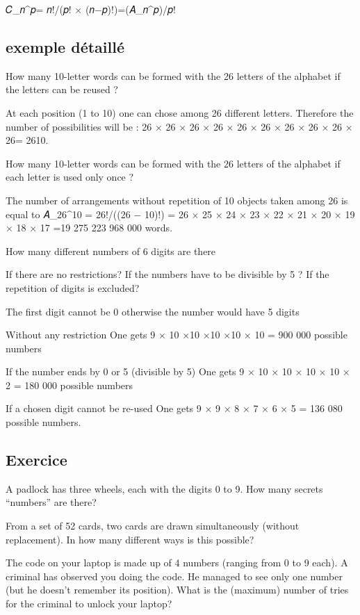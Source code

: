 \documentclass[
  letterpaper,
  DIV=11,
  numbers=noendperiod]{scrreprt}
\begin{document}
𝐶\_𝑛\^{}𝑝= 𝑛!/(𝑝! × (𝑛−𝑝)!)=(𝐴\_𝑛\^{}𝑝)/𝑝!

\subsection{exemple détaillé}\label{exemple-duxe9tailluxe9}

How many 10-letter words can be formed with the 26 letters of the
alphabet if the letters can be reused ?

At each position (1 to 10) one can chose among 26 different letters.
Therefore the number of possibilities will be : 26 × 26 × 26 × 26 × 26 ×
26 × 26 × 26 × 26 × 26= 2610.

How many 10-letter words can be formed with the 26 letters of the
alphabet if each letter is used only once ?

The number of arrangements without repetition of 10 objects taken among
26 is equal to 𝐴\_26\^{}10 = 26!/((26 − 10)!) = 26 × 25 × 24 × 23 × 22 ×
21 × 20 × 19 × 18 × 17 =19 275 223 968 000 words.

How many different numbers of 6 digits are there

If there are no restrictions? If the numbers have to be divisible by 5 ?
If the repetition of digits is excluded?

The first digit cannot be 0 otherwise the number would have 5 digits

Without any restriction One gets 9 × 10 ×10 ×10 ×10 × 10 = 900 000
possible numbers

If the number ends by 0 or 5 (divisible by 5) One gets 9 × 10 × 10 × 10
× 10 × 2 = 180 000 possible numbers

If a chosen digit cannot be re-used One gets 9 × 9 × 8 × 7 × 6 × 5 = 136
080 possible numbers.

\subsection{Exercice}\label{exercice}

A padlock has three wheels, each with the digits 0 to 9. How many
secrets ``numbers'' are there?

From a set of 52 cards, two cards are drawn simultaneously (without
replacement). In how many different ways is this possible?

The code on your laptop is made up of 4 numbers (ranging from 0 to 9
each). A criminal has observed you doing the code. He managed to see
only one number (but he doesn't remember its position). What is the
(maximum) number of tries for the criminal to unlock your laptop?
\end{document}
